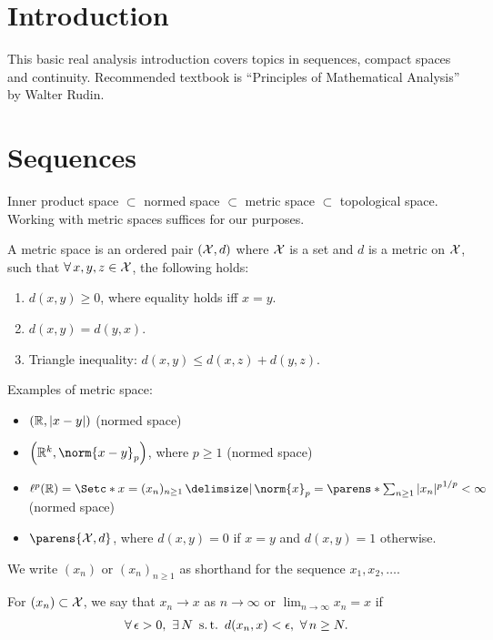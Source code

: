 \documentclass[12pt]{article}
\begin{document}

\section{Introduction}
This basic real analysis introduction covers topics in sequences, compact spaces and continuity. Recommended textbook is ``Principles of Mathematical Analysis'' by Walter Rudin. 

\section{Sequences}
Inner product space $\subset$ normed space $\subset$ metric space $\subset$ topological space. Working with metric spaces suffices for our purposes.

\begin{Definition}
A metric space is an ordered pair $\left(\mathcal{X}, d\right)$ where $\mathcal{X}$ is a set and $d$ is a metric on $\mathcal{X}$, such that $\forall x, y, z \in \calX$, the following holds:
\begin{enumerate}[1)]
\item $d(x,y) \geq 0$, where equality holds iff $x=y$.
\item $d(x,y)=d(y,x)$.
\item Triangle inequality: $d(x,y) \leq d(x,z) + d(y,z)$.
\end{enumerate}
\end{Definition}

\begin{Example} Examples of metric space:
\begin{itemize} 
\item $\left(\mathbb{R}, |x-y|\right)$ (normed space)
\item $\left(\bbR^k, \norm{x-y}_p\right)$, where $p \geq 1$ (normed space)
\item $\ell^p(\Real) = \set*{ x = (x_n)_{n\geq1} \given \norm{x}_p=\parens*{\sum_{n\geq1} |x_n|^p}^{1/p} < \infty}$ (normed space)
\item $\parens{\calX, d}$, where $d(x,y)=0$ if $x=y$ and $d(x,y)=1$ otherwise.
\end{itemize}
\end{Example}

We write $(x_n)$ or $(x_n)_{n\geq1}$ as shorthand for the sequence $x_1, x_2, \ldots$.

\begin{Definition}
For $(x_n) \subset \mathcal{X}$, we say that $x_n \to x$ as $n\to\infty$ or $\lim_{n\to\infty} x_n=x$ if 
\begin{align*}
\forall \epsilon>0,\ \exists N\ \st d(x_n, x) < \epsilon,\ \forall n \geq N.
\end{align*}
\end{Definition}
\end{document}
